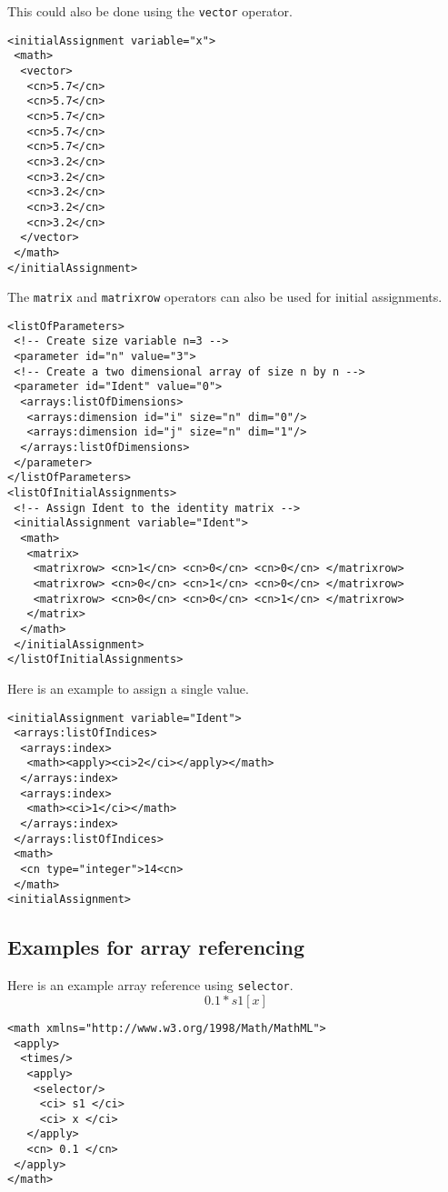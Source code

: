 This could also be done using the {\tt vector} operator.

\begin{verbatim}
<initialAssignment variable="x"> 
 <math>
  <vector> 
   <cn>5.7</cn> 
   <cn>5.7</cn> 
   <cn>5.7</cn> 
   <cn>5.7</cn> 
   <cn>5.7</cn> 
   <cn>3.2</cn> 
   <cn>3.2</cn> 
   <cn>3.2</cn> 
   <cn>3.2</cn> 
   <cn>3.2</cn>
  </vector>
 </math>
</initialAssignment>
\end{verbatim}

The {\tt matrix} and {\tt matrixrow} operators can also be used for initial assignments.

\begin{verbatim}
<listOfParameters>
 <!-- Create size variable n=3 -->
 <parameter id="n" value="3"> 
 <!-- Create a two dimensional array of size n by n -->
 <parameter id="Ident" value="0"> 
  <arrays:listOfDimensions>
   <arrays:dimension id="i" size="n" dim="0"/>
   <arrays:dimension id="j" size="n" dim="1"/>
  </arrays:listOfDimensions>
 </parameter>
</listOfParameters>
<listOfInitialAssignments>
 <!-- Assign Ident to the identity matrix -->
 <initialAssignment variable="Ident">
  <math>
   <matrix> 
    <matrixrow> <cn>1</cn> <cn>0</cn> <cn>0</cn> </matrixrow>
    <matrixrow> <cn>0</cn> <cn>1</cn> <cn>0</cn> </matrixrow> 
    <matrixrow> <cn>0</cn> <cn>0</cn> <cn>1</cn> </matrixrow> 
   </matrix>
  </math> 
 </initialAssignment>
</listOfInitialAssignments>
\end{verbatim}

Here is an example to assign a single value. 

\begin{verbatim}
<initialAssignment variable="Ident"> 
 <arrays:listOfIndices>
  <arrays:index>
   <math><apply><ci>2</ci></apply></math>
  </arrays:index>
  <arrays:index>
   <math><ci>1</ci></math>
  </arrays:index>
 </arrays:listOfIndices>
 <math>
  <cn type="integer">14<cn>
 </math>
<initialAssignment>
\end{verbatim}

\subsection{Examples for array referencing}

Here is an example array reference using {\tt selector}.
\begin{displaymath}
0.1 * s1[x]
\end{displaymath}
\begin{verbatim}
<math xmlns="http://www.w3.org/1998/Math/MathML">
 <apply>
  <times/>
   <apply>
    <selector/>
     <ci> s1 </ci>
     <ci> x </ci> 
   </apply>
   <cn> 0.1 </cn>
 </apply>
</math>
\end{verbatim}

